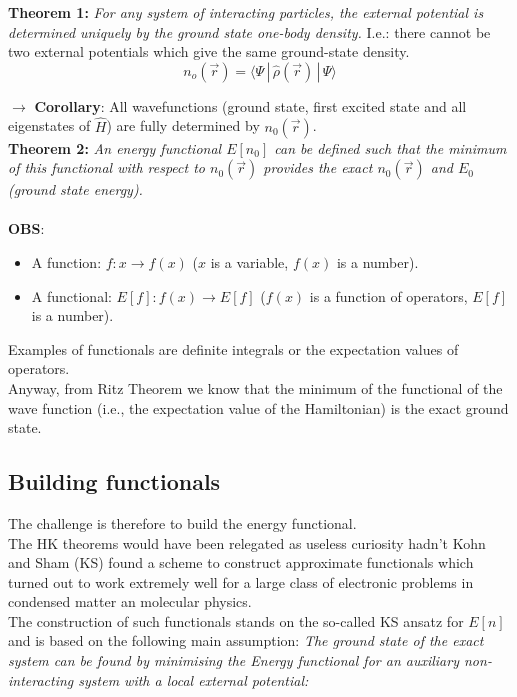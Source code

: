 \textbf{Theorem 1:} \textit{For any system of interacting particles, the external potential is determined uniquely by the ground state one-body density.} I.e.: there cannot be two  external potentials which give the same ground-state density.
\[n_o(\vec{r})=\langle \Psi\,|\,\hat{\rho}(\vec{r})\,|\,\Psi \rangle\]

$\rightarrow\,\,$\textbf{Corollary}: All wavefunctions (ground state, first excited state and all eigenstates of $\hat{H}$) are fully determined by $n_0(\vec{r})$.\\

\textbf{Theorem 2:} \textit{An energy functional $E[n_0]$ can be defined such that the minimum of this functional with respect to $n_0(\vec{r})$ provides the exact $n_0(\vec{r})$ and $E_0$ (ground state energy).}\\
\\

\textbf{OBS}: 
\begin{itemize}
\item A function: $f: x \rightarrow f(x)$ ($x$ is a variable, $f(x)$ is a number).
\item A functional: $E[f]: f(x) \rightarrow E[f]$ ($f(x)$ is a function of operators, $E[f]$ is a number).
\end{itemize} 
 
Examples of functionals are definite integrals or the expectation values of operators.\\
Anyway, from Ritz Theorem we know that the minimum of the functional of the wave function (i.e., the expectation value of the Hamiltonian) is the exact ground state.\\
\subsection{Building functionals}
The challenge is therefore to build the energy functional.\\
The HK theorems would have been relegated as useless curiosity hadn’t Kohn and Sham
(KS) found a scheme to construct approximate functionals which turned out to
work extremely well for a large class of electronic problems in condensed matter an
molecular physics. \\
The construction of such functionals stands on the so-called KS ansatz for $E[n]$
and is based on the following main assumption: \textit{The ground state of the exact system can be found by minimising the Energy functional for an auxiliary non-interacting system with a local external potential:}


